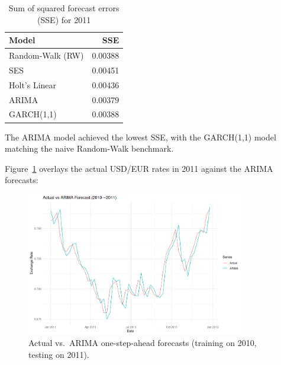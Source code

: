 \documentclass[11pt,a4paper]{article}
\begin{document}
    \begin{table}[H]
    \centering
    \caption{Sum of squared forecast errors (SSE) for 2011}
    \label{tab:forecast_sse}
    \small
    \begin{tabular}{l r}
        \toprule
        Model              & SSE         \\ 
        \midrule
        Random‐Walk (RW)   & 0.00388     \\ 
        SES                & 0.00451     \\ 
        Holt’s Linear      & 0.00436     \\ 
        ARIMA              & \(\mathbf{0.00379}\)  \\ 
        GARCH(1,1)         & 0.00388     \\ 
        \bottomrule
    \end{tabular}
    \end{table}

    The ARIMA model achieved the lowest SSE, with the GARCH(1,1) model matching the naive Random-Walk benchmark.

    Figure~\ref{fig:forecast_plot} overlays the actual USD/EUR rates in 2011 against the ARIMA forecasts:

    \begin{figure}[ht]
    \centering
    \includegraphics[width=0.85\textwidth]{figures/best_forecast_arima_2010_2011.png}
    \caption{Actual vs.\ ARIMA one-step-ahead forecasts (training on 2010, testing on 2011).}
    \label{fig:forecast_plot}
    \end{figure}
\end{document}
